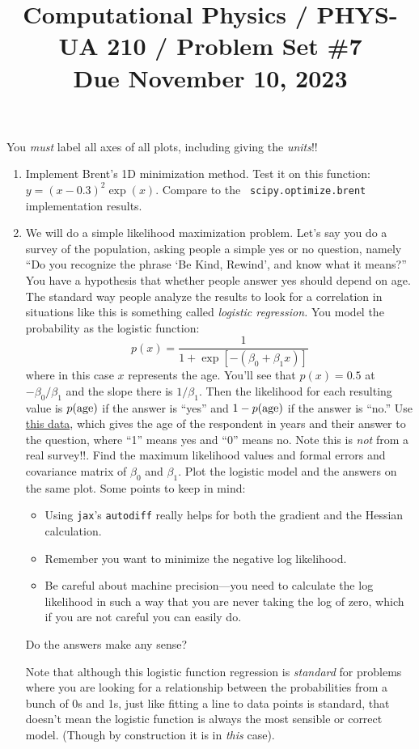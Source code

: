 \documentclass[11pt, preprint]{aastex}
\begin{document}
\title{\bf Computational Physics / PHYS-UA 210 / Problem Set \#7
\\ Due November 10, 2023 }

You {\it must} label all axes of all plots, including giving the {\it
  units}!!

\begin{enumerate}
\item Implement Brent's 1D minimization method. Test it on this
function: $y= (x -0.3)^2 \exp(x)$. Compare to the {\tt
scipy.optimize.brent} implementation results.
\item We will do a simple likelihood maximization problem. Let's say
  you do a survey of the population, asking people a simple yes or no
  question, namely ``Do you recognize the phrase `Be Kind, Rewind',
  and know what it means?'' You have a hypothesis that whether people
  answer yes should depend on age. The standard way people analyze the
  results to look for a correlation in situations like this is
  something called {\it logistic regression.} You model the
  probability as the logistic function:
  \begin{equation}
    p(x) = \frac{1}{1+ \exp\left[-(\beta_0 + \beta_1 x)\right]}
  \end{equation}
  where in this case $x$ represents the age.  You'll see that
  $p(x)=0.5$ at $-\beta_0/\beta_1$ and the slope there is $1/\beta_1$.
  Then the likelihood for each resulting value is $p({\rm age})$ if
  the answer is ``yes'' and $1 - p({\rm age})$ if the answer is
  ``no.''  Use
  \href{https://github.com/blanton144/computational-grad/blob/main/data/survey.csv}{this
    data}, which gives the age of the respondent in years and their
  answer to the question, where ``1'' means yes and ``0'' means
  no. Note this is {\it not} from a real survey!!.  Find the maximum
  likelihood values and formal errors and covariance matrix of
  $\beta_0$ and $\beta_1$. Plot the logistic model and the answers on
  the same plot. Some points to keep in mind:
  \begin{itemize}
    \item Using {\tt jax}'s {\tt autodiff} really helps for both the
      gradient and the Hessian calculation. 
    \item Remember you want to minimize the negative log likelihood.
    \item Be careful about machine precision---you need to calculate
      the log likelihood in such a way that you are never taking the
      log of zero, which if you are not careful you can easily do.
  \end{itemize}
  Do the answers make any sense?

  Note that although this logistic function regression is {\it
    standard} for problems where you are looking for a relationship
  between the probabilities from a bunch of 0s and 1s, just like
  fitting a line to data points is standard, that doesn't mean the
  logistic function is always the most sensible or correct model.
  (Though by construction it is in {\it this} case).
\end{enumerate}
\end{document}
